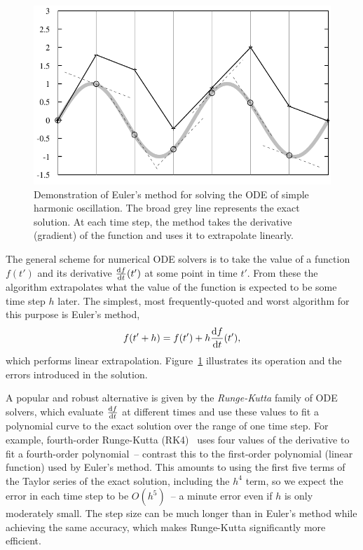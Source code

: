 \begin{figure}
\centerline{\includegraphics{figures/euler}}
\caption{Demonstration of Euler's method for solving the ODE of simple harmonic oscillation.
    The broad grey line represents the exact solution. At each time step, the method takes the
    derivative (gradient) of the function and uses it to extrapolate linearly.\label{eulersMethod}}
\end{figure}

The general scheme for numerical ODE solvers is to take the value of a function $f(t')$ and its
derivative $\frac{\mathrm{d} f}{\mathrm{d} t}(t')$ at some point in time $t'$. From these the algorithm
extrapolates what the value of the function is expected to be some time step $h$ later. The
simplest, most frequently-quoted and worst algorithm for this purpose is Euler's method,
\begin{equation}
f(t'+h) = f(t') + h\frac{\mathrm{d} f}{\mathrm{d} t}(t'),
\end{equation}
which performs linear extrapolation. Figure~\ref{eulersMethod} illustrates its operation and the
errors introduced in the solution.

A popular and robust alternative is given by the \emph{Runge-Kutta} family of ODE solvers, which
evaluate $\frac{\mathrm{d} f}{\mathrm{d} t}$ at different times and use these values to fit a polynomial
curve to the exact solution over the range of one time step. For example, fourth-order Runge-Kutta
(RK4)~\cite{NRinC} uses four values of the derivative to fit a fourth-order polynomial~-- contrast
this to the first-order polynomial (linear function) used by Euler's method. This amounts to using
the first five terms of the Taylor series of the exact solution, including the $h^4$ term, so
we expect the error in each time step to be $O(h^5)$~-- a minute error even if $h$ is only
moderately small. The step size can be much longer than in Euler's method while achieving the same
accuracy, which makes Runge-Kutta significantly more efficient.

